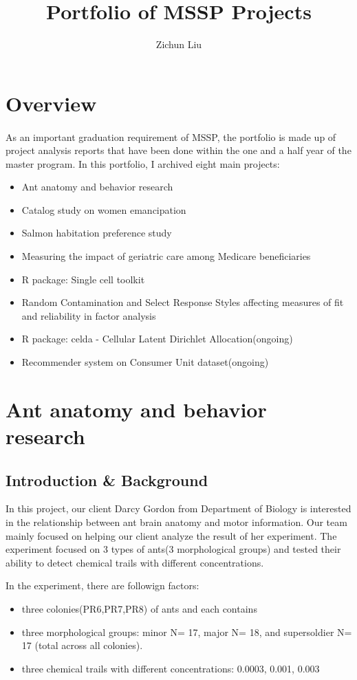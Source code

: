 \documentclass{article}
\title{Portfolio of MSSP Projects}
\author{Zichun Liu}
\begin{document}
	\maketitle
	\section{Overview}
	\paragraph{} As an important graduation requirement of MSSP, the portfolio is made up of project analysis reports that have been done within the one and a half year of the master program. In this portfolio, I archived eight main projects:
	\begin{itemize}
		\item Ant anatomy and behavior research
		\item Catalog study on women emancipation
		\item Salmon habitation preference study
		\item Measuring the impact of geriatric care among Medicare beneficiaries
		\item R package: Single cell toolkit
		\item Random Contamination and Select Response Styles affecting measures of fit and reliability in factor analysis
		\item R package: celda - Cellular Latent Dirichlet Allocation(ongoing)
		\item Recommender system on Consumer Unit dataset(ongoing)		
	\end{itemize}

	\section{Ant anatomy and behavior research}
	\subsection{Introduction \& Background}
	In this project, our client Darcy Gordon from Department of Biology is interested in the relationship between ant brain anatomy and motor information. Our team mainly focused on helping our client analyze the result of her experiment. The experiment focused on 3 types of ants(3 morphological groups) and tested their ability to detect chemical trails with different concentrations. 
	
	In the experiment, there are followign factors:
	\begin{itemize}
		\item three colonies(PR6,PR7,PR8) of ants and each contains
		\item three morphological groups:
			\subitem minor N= 17,
			\subitem major N= 18, and
			\subitem supersoldier N= 17 (total across all colonies).
		\item three chemical trails with different concentrations: 0.0003, 0.001, 0.003
	\end{itemize}
	
\end{document}
